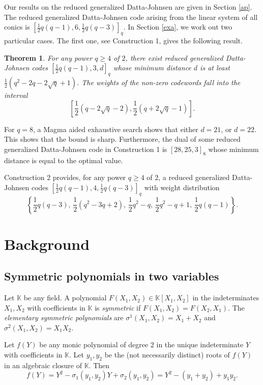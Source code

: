 \documentclass[sn-mathphys-num]{sn-jnl}%
\newtheorem{theorem}{Theorem}
\begin{document}
Our results on the reduced generalized Datta-Johnsen are given in  Section \ref{ap}. The reduced generalized Datta-Johnsen code arising from the linear system of all conics is  $\left[\frac{1}{2} q(q-1),6,\frac{1}{2}q(q-3)\right]_q$.
In Section \ref{exa}, we work out two particular cases. The first one, see Construction 1, gives the following result.
\begin{theorem}
\label{main271224} For any power $q\ge 4$ of $2$, there exist reduced generalized Datta-Johnsen codes  $\left[\textstyle{\frac{1}{2}} q(q-1),3,d\right]_q$ whose minimum distance $d$ is at least $\textstyle{\frac{1}{2}}\left(q^2-2q-2\sqrt{q}+1\right)$. The weights of the non-zero codewords fall into
the interval
$$\left[\textstyle{\frac{1}{2}}(q-2\sqrt{q}-2),
 \textstyle{\frac{1}{2}}(q+2\sqrt{q}-1)\right].$$
\end{theorem}
For $q=8$, a Magma aided exhaustive search shows that either $d=21$, or $d=22$. This shows that the bound is sharp. Furthermore, the dual of some reduced generalized Datta-Johnsen code in Construction 1 is $[28,25,3]_8$ whose minimum distance is equal to the optimal value.

Construction 2 provides, for any power $q\ge 4$ of $2$, a reduced generalized Datta-Johnsen codes  $\left[\frac{1}{2} q(q-1),4,\frac{1}{2}q(q-3)\right]_q$  with weight distribution
$$\left\{\textstyle{\frac{1}{2}}q(q-3),\,\textstyle{\frac{1}{2}}(q^2-3q+2),\, \textstyle{\frac{1}{2}}q^2-q,\,\textstyle{\frac{1}{2}}q^2-q+1,\, \textstyle{\frac{1}{2}}q(q-1)\right\}.$$

\section{Background}
\subsection{Symmetric polynomials in two variables}
\label{smp}
Let $\mathbb{K}$ be any field.
A polynomial $F\left(X_1,X_2\right)\in \mathbb{K}\left[X_1,X_2\right]$ in the indeterminates $X_1,X_2$ with coefficients in $\mathbb{K}$ is \emph{symmetric} if $F\left(X_1,X_2\right)=F\left(X_2,X_1\right)$.
The \emph{elementary symmetric polynomials} are
$\sigma^1(X_1,X_2)=X_1+X_2$ and $\sigma^2(X_1,X_2)=X_1X_2$.

Let $f(Y)$ be any monic polynomial of degree $2$ in the unique indeterminate $Y$ with coefficients in $\mathbb{K}$. Let $y_1,y_2$ be the (not necessarily distinct) roots of $f(Y)$ in an algebraic closure of $\mathbb{K}$. Then
\begin{equation*}\label{monic}
    f(Y)=Y^2-\sigma_1(y_1,y_2)Y+\sigma_2(y_1,y_2)=Y^2-(y_1+y_2)+y_1y_2.
\end{equation*}
\end{document}
